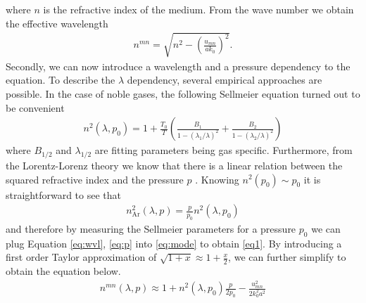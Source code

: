 \documentclass[fleqn, 10pt, twocolumn]{SelfArx}
\begin{document}
    where $n$ is the refractive index of the medium.
    From the wave number we obtain the effective wavelength
    \begin{align}
        n^{mn} = \sqrt{n^2 - \left( \frac{u_{mn}}{a k_0}\right)^2}.
        \label{eq:mode}
    \end{align}
    Secondly, we can now introduce a wavelength and a pressure dependency to the equation. To describe the $\lambda$ dependency, several empirical approaches are possible. 
    In the case of noble gases, the following Sellmeier equation turned out to be convenient \cite{Borzsonyi2008}
    \begin{align}
       n^2(\lambda, p_0)  = 1 + \frac{T_0}{T} \left(\frac{B_1}{1- (\lambda_1/\lambda)^2} + \frac{B_2}{1- (\lambda_2/\lambda)^2}  \right)
        \label{eq:wvl}
    \end{align}
    where $B_{1/2}$ and $\lambda_{1/2}$ are fitting parameters being gas specific.
    Furthermore, from the Lorentz-Lorenz theory
    we know that there is a linear relation between the squared refractive index and the pressure $p$ \cite{Borzsonyi2008}.
    Knowing $n^2(p_0) \sim p_0$ it is straightforward to see that
    \begin{align}
        n_{\text{Ar}}^2(\lambda, p) = \frac{p}{p_0} n^2(\lambda, p_0)
        \label{eq:p}
    \end{align}
    and therefore by measuring the Sellmeier parameters for a pressure $p_0$ we can plug Equation \ref{eq:wvl}, \ref{eq:p} into \ref{eq:mode} to obtain \eqref{eq1}. 
    By introducing a first order Taylor approximation of $\sqrt{1+x} \approx 1 + \frac{x}{2}$, we can further simplify to obtain the equation below.
    \begin{align}
        n^{mn}(\lambda, p) \approx 1 + n^2(\lambda, p_0) \frac{p}{2p_0} -  \frac{u_{mn}^2}{2 k_0^2 a^2}
        \label{eq1a}
    \end{align}
\end{document}
